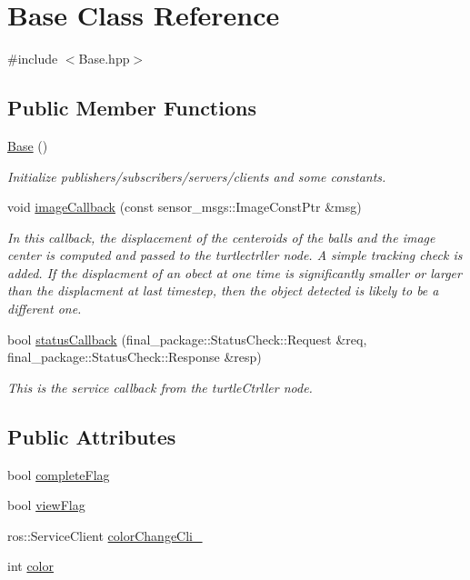 \hypertarget{classBase}{}\section{Base Class Reference}
\label{classBase}


{\ttfamily \#include $<$Base.\+hpp$>$}

\subsection*{Public Member Functions}
\begin{DoxyCompactItemize}
\item 
\hyperlink{classBase_a5ffe0568374d8b9b4c4ec32953fd6453}{Base} ()
\begin{DoxyCompactList}\small\item\em Initialize publishers/subscribers/servers/clients and some constants. \end{DoxyCompactList}\item 
void \hyperlink{classBase_a07d8eb5e372ccab3c866c5abdce90d64}{image\+Callback} (const sensor\+\_\+msgs\+::\+Image\+Const\+Ptr \&msg)
\begin{DoxyCompactList}\small\item\em In this callback, the displacement of the centeroids of the balls and the image center is computed and passed to the turtlectrller node. A simple tracking check is added. If the displacment of an obect at one time is significantly smaller or larger than the displacment at last timestep, then the object detected is likely to be a different one. \end{DoxyCompactList}\item 
bool \hyperlink{classBase_a8b091924a7e8398ea11babdab370fd3f}{status\+Callback} (final\+\_\+package\+::\+Status\+Check\+::\+Request \&req, final\+\_\+package\+::\+Status\+Check\+::\+Response \&resp)
\begin{DoxyCompactList}\small\item\em This is the service callback from the turtle\+Ctrller node. \end{DoxyCompactList}\end{DoxyCompactItemize}
\subsection*{Public Attributes}
\begin{DoxyCompactItemize}
\item 
bool \hyperlink{classBase_a10b0afead866cc8cf2f5e2208a29d9f1}{complete\+Flag}
\item 
bool \hyperlink{classBase_a23f826e2edce258c38dbe0c2b7f94c20}{view\+Flag}
\item 
ros\+::\+Service\+Client \hyperlink{classBase_a874255744854a842b88ccab8674fca90}{color\+Change\+Cli\+\_\+}
\item 
int \hyperlink{classBase_af4c79a5d92200b5adf98634163333876}{color}
\end{DoxyCompactItemize}


